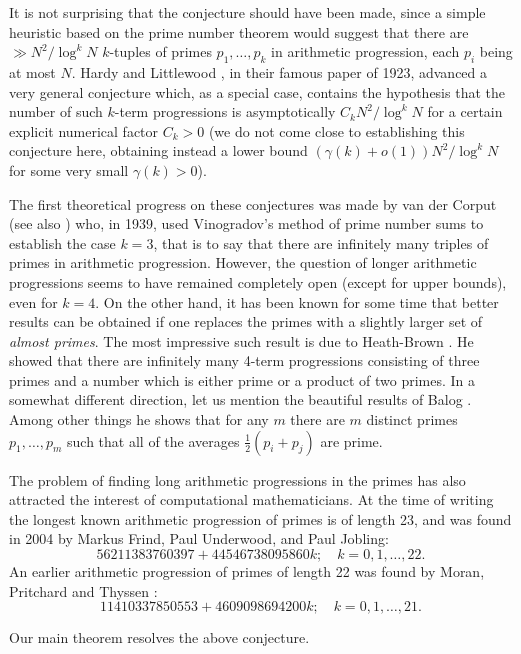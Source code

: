 \documentclass[12pt,a4paper,reqno]{amsart}
\numberwithin{equation}{section}
\theoremstyle{plain}
\theoremstyle{definition}
\def\vs{\vspace{11pt}}
\def\ni{\noindent}
\def\emph#1{{\it #1}}
\begin{document}
\ni It is not surprising that the conjecture should have been made, since a simple heuristic based on the prime number theorem would suggest that there are $\gg N^2/\log^k N$ $k$-tuples of primes $p_1,\dots,p_k$ in arithmetic progression, each $p_i$ being at most $N$. Hardy and Littlewood \cite{hardy-littlewood}, in their famous paper of 1923, advanced a very general conjecture which, as a special case, contains the hypothesis that the number of such $k$-term progressions is asymptotically $C_kN^2/\log^k N$ for a certain explicit numerical factor $C_k > 0$ (we do not come close to establishing this conjecture here, obtaining instead
a lower bound $(\gamma(k) + o(1)) N^2 / \log^k N$ for some very small $\gamma(k) > 0$).\vs

\ni The first theoretical progress on these conjectures was made by van der Corput \cite{van-der-corput} (see also \cite{chowla}) who, in 1939, used Vinogradov's method of prime number sums to establish the case $k = 3$, that is to say that there are infinitely many triples of primes in arithmetic progression.  However, the question of longer arithmetic progressions seems to have remained completely open (except for upper bounds), even for $k=4$.  On the other hand, it has been known for some time that better results can be obtained if one replaces the primes with
a slightly larger set of \emph{almost primes}. The most impressive such result is due to Heath-Brown \cite{heath-brown1}. He showed that there are infinitely many 4-term progressions consisting of three primes and a number which is either prime or a product of two primes. In a somewhat different direction, let us mention the beautiful results of Balog \cite{balog1,balog2}. Among other things he shows that for any $m$ there are $m$ distinct primes $p_1,\dots,p_m$ such that all of the averages $\frac{1}{2}(p_i + p_j)$ are prime.\vs

\ni The problem of finding long arithmetic progressions in the primes has also attracted the interest of computational mathematicians. At the time of writing the longest known arithmetic progression of primes is of length 23, and was found in 2004 by Markus Frind, Paul Underwood, and Paul Jobling:
\[ 56211383760397 + 44546738095860 k; \quad k = 0, 1, \ldots, 22.\]
An earlier arithmetic progression of primes of length 22 was found by Moran, Pritchard and Thyssen \cite{moran-pritchard-thyssen}:
\[ 11410337850553 + 4609098694200k; \quad k = 0, 1, \ldots, 21.\]

\ni Our main theorem resolves the above conjecture.
\end{document}

